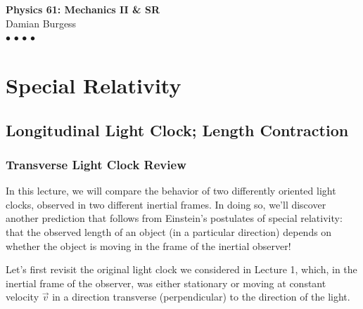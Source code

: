 \documentclass[11pt, letterpaper, openany]{book}
\newcommand{\makePhysCover}[2]{
    \begin{titlepage}
        \pagecolor{PhysNavy} 
        \color{PhysCream}
        \vspace*{2in}
        \begin{center}
            {\fontsize{50}{60}\selectfont \sffamily\bfseries #1} \\[1em]
            {\fontsize{20}{25}\selectfont \sffamily #2} \\[3in]
            {\color{PhysRed}\Huge $\bullet$} \quad 
            {\color{PhysGold}\Huge $\bullet$} \quad 
            {\color{PhysTeal}\Huge $\bullet$} \quad 
            {\color{PhysPurple}\Huge $\bullet$}
        \end{center}
    \end{titlepage}
    \pagecolor{PhysCream} 
}
\begin{document}
\makePhysCover{Physics 61: Mechanics II \& SR}{Damian Burgess}

{
  \hypersetup{linkcolor=PhysNavy}
  \tableofcontents
}

\part{Special Relativity}

\chapter{Longitudinal Light Clock; Length Contraction}

\section{Transverse Light Clock Review}
In this lecture, we will compare the behavior of two differently oriented light clocks, observed in two different inertial frames. In doing so, we'll discover another prediction that follows from Einstein's postulates of special relativity: that the observed length of an object (in a particular direction) depends on whether the object is moving in the frame of the inertial observer!

Let's first revisit the original light clock we considered in Lecture 1, which, in the inertial frame of the observer, was either stationary or moving at constant velocity $\vec{v}$ in a direction transverse (perpendicular) to the direction of the light.
\end{document}

